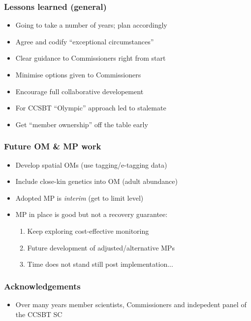 \documentclass{beamer}
\begin{document}
\begin{frame}
    \frametitle{Lessons learned (general)}
\begin{itemize}
    \item Going to take a number of years; plan accordingly
    \item Agree and codify ``exceptional circumstances''
    \item Clear guidance to Commissioners right from start
    \item Minimise options given to Commissioners
    \item Encourage full collaborative developement
    \item For CCSBT ``Olympic'' approach led to stalemate
    \item Get ``member ownership'' off the table early
\end{itemize}
\end{frame}
\begin{frame}
    \frametitle{Future OM \& MP work}
\begin{itemize}
    \item Develop spatial OMs (use tagging/e-tagging data)
    \item Include close-kin genetics into OM (adult abundance)
    \item Adopted MP is \emph{interim} (get to limit level)
    \item MP in place is good but not a recovery guarantee:
        \begin{enumerate}
            \item Keep exploring cost-effective monitoring
            \item Future development of adjusted/alternative MPs
            \item Time does not stand still post implementation...
        \end{enumerate}
\end{itemize}
\end{frame}
\begin{frame}
    \frametitle{Acknowledgements}
\begin{itemize}
    \item Over many years member scientists, Commissioners and indepedent panel of the CCSBT SC
\end{itemize}
\end{frame}
\end{document}
